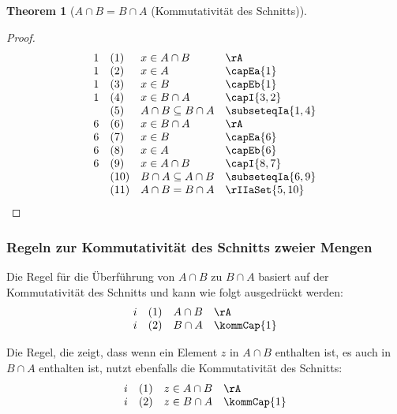 \documentclass{book}
\theoremstyle{plain}
\newtheorem{theorem}{Theorem}
\theoremstyle{remark}
\theoremstyle{definition}
\begin{document}
\label{AcaBEqualsBcaA}
\begin{theorem}[\(A \cap B = B \cap A\) (Kommutativität des Schnitts)]
\end{theorem}
\begin{proof}
	\[
	\begin{array}{llll}
		1 & (1) & x \in A \cap B & \rA \\
		1 & (2) & x \in A & \capEa{1} \\
		1 & (3) & x \in B & \capEb{1} \\
		1 & (4) & x \in B \cap A & \capI{3,2} \\
		& (5) & A\cap B\subseteq B \cap A & \subseteqIa{1,4} \\
		6 & (6) & x \in B \cap A & \rA \\
		6 & (7) & x \in B & \capEa{6} \\
		6 & (8) & x \in A & \capEb{6} \\
		6 & (9) & x \in A \cap B & \capI{8,7} \\
		& (10) & B\cap A\subseteq A \cap B & \subseteqIa{6,9} \\
		& (11) & A\cap B=B\cap A & \rIIaSet{5,10} \\
	\end{array}
	\]
\end{proof}

\subsubsection{Regeln zur Kommutativität des Schnitts zweier Mengen}
\label{rule:kommCap}

Die Regel für die Überführung von \(A \cap B\) zu \(B \cap A\) basiert auf der Kommutativität des Schnitts und kann wie folgt ausgedrückt werden:
\[
\begin{array}{llll}
	i & (1) & A \cap B & \rA \\
	i & (2) & B \cap A & \kommCap{1} \\
\end{array}
\]

Die Regel, die zeigt, dass wenn ein Element \(z\) in \(A \cap B\) enthalten ist, es auch in \(B \cap A\) enthalten ist, nutzt ebenfalls die Kommutativität des Schnitts:
\[
\begin{array}{llll}
	i & (1) & z \in A \cap B & \rA \\
	i & (2) & z \in B \cap A & \kommCap{1} \\
\end{array}
\]
\end{document}
